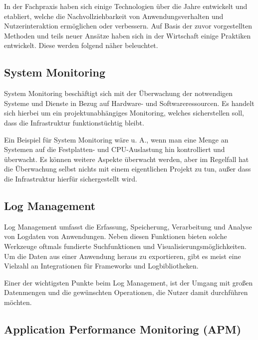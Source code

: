 
In der Fachpraxis haben sich einige Technologien über die Jahre entwickelt und etabliert, welche die Nachvollziehbarkeit von Anwendungsverhalten und Nutzerinteraktion ermöglichen oder verbessern. Auf Basis der zuvor vorgestellten Methoden und teils neuer Ansätze haben sich in der Wirtschaft einige Praktiken entwickelt. Diese werden folgend näher beleuchtet.

\subsection{System Monitoring}

System Monitoring beschäftigt sich mit der Überwachung der notwendigen Systeme und Dienste in Bezug auf Hardware- und Softwareressourcen. Es handelt sich hierbei um ein projektunabhängiges Monitoring, welches sicherstellen soll, dass die Infrastruktur funktionstüchtig bleibt.

Ein Beispiel für System Monitoring wäre u. A., wenn man eine Menge an Systemen auf die Festplatten- und CPU-Auslastung hin kontrolliert und überwacht. Es können weitere Aspekte überwacht werden, aber im Regelfall hat die Überwachung selbst nichts mit einem eigentlichen Projekt zu tun, außer dass die Infrastruktur hierfür sichergestellt wird.

\subsection{Log Management}

Log Management umfasst die Erfassung, Speicherung, Verarbeitung und Analyse von Logdaten von Anwendungen. Neben diesen Funktionen bieten solche Werkzeuge oftmals fundierte Suchfunktionen und Visualisierungsmöglichkeiten. Um die Daten aus einer Anwendung heraus zu exportieren, gibt es meist eine Vielzahl an Integrationen für Frameworks und Logbibliotheken.

Einer der wichtigsten Punkte beim Log Management, ist der Umgang mit großen Datenmengen und die gewünschten Operationen, die Nutzer damit durchführen möchten.

\subsection{Application Performance Monitoring (APM)}

